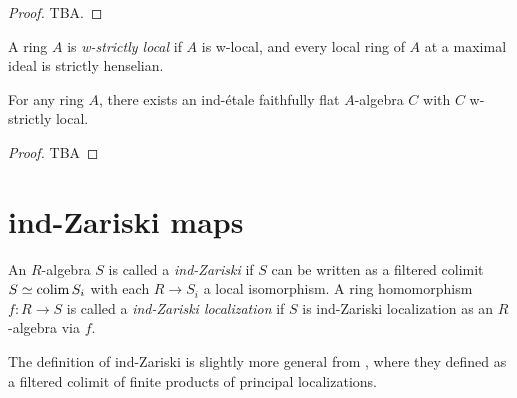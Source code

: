 \begin{proof}
  TBA.
\end{proof}



\begin{definition}
    A ring \(A\) is \emph{w-strictly local} if \(A\) is w-local, and every local ring of \(A\) at a maximal ideal is strictly henselian.
    \label{def:w-strictly-local-ring}
\end{definition}

\begin{lemma}
  For any ring \(A\), there exists an ind-étale faithfully flat \(A\)-algebra \(C\) with \(C\) w-strictly local.
  \label{thm:ind-etale-w-strictly-local-cover}
\end{lemma}

\begin{proof}
  TBA
\end{proof}

\section{ind-Zariski maps}

\begin{definition}
    \label{def:ind-zariski}

    An $R$-algebra $S$ is called a \emph{ind-Zariski} if $S$ can be written as a filtered colimit $S \simeq \operatorname{colim} S_i$ with each $R \to S_i$ a local isomorphism. A ring homomorphism $f : R \to S$ is called a \emph{ind-Zariski localization} if $S$ is ind-Zariski localization as an $R$-algebra via $f$.

\end{definition}

\begin{remark}
  The definition of ind-Zariski is slightly more general from \cite[Definition 2.2.1(iv)]{proetale}, where they defined as a filtered colimit of finite products of principal localizations. 
\end{remark}

